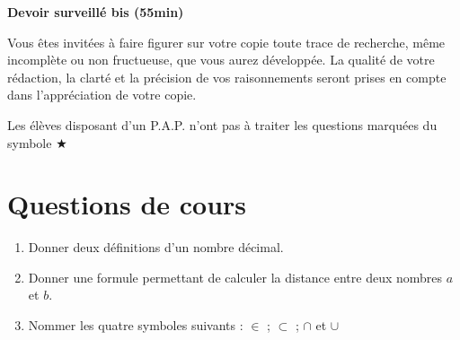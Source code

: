 \documentclass[oneside,12pt]{exam}          %
\begin{document}
\footer{}{\footnotesize \etablissement}{}

\hrulefill\raisebox{-1.9pt}{\quad\decofourleft~\decosix~\decofourright \quad}\hrulefill

\begin{center}
	\textbf{\large Devoir surveillé  bis (55min)}
\end{center}
\vspace{-5pt}
Vous êtes invité\textperiodcentered e\textperiodcentered s à faire figurer sur votre copie toute trace de recherche, même incomplète ou non fructueuse, que vous aurez développée. La qualité de votre rédaction, la clarté et la précision de vos raisonnements seront prises en compte dans l’appréciation de votre copie.

Les élèves disposant d'un P.A.P. n'ont pas à traiter les questions marquées du symbole $\bigstar$

\vspace{-8pt}\hrulefill\raisebox{-1.9pt}{\quad\decofourleft~\decosix~\decofourright \quad}\hrulefill
\vspace{5pt}



\section{Questions de cours}
\begin{enumerate}
	\item Donner deux définitions d'un nombre décimal.
	\item Donner une formule permettant de calculer la distance entre deux nombres $a$ et $b$.
	\item Nommer les quatre symboles suivants : $\in$ ; $\subset$ ; $\cap$ et $\cup$
\end{enumerate}
\end{document}
